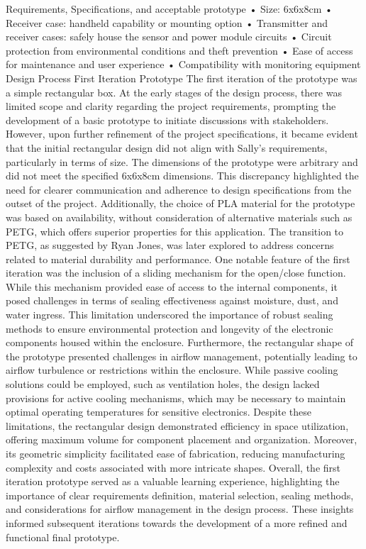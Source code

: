 \documentclass[class=report,11pt,crop=false]{standalone}
\begin{document}
Requirements, Specifications, and acceptable prototype
•	Size: 6x6x8cm
•	Receiver case: handheld capability or mounting option
•	Transmitter and receiver cases: safely house the sensor and power module circuits
•	Circuit protection from environmental conditions and theft prevention
•	Ease of access for maintenance and user experience
•	Compatibility with monitoring equipment
Design Process
First Iteration Prototype
The first iteration of the prototype was a simple rectangular box. At the early stages of the design process, there was limited scope and clarity regarding the project requirements, prompting the development of a basic prototype to initiate discussions with stakeholders.
However, upon further refinement of the project specifications, it became evident that the initial rectangular design did not align with Sally's requirements, particularly in terms of size. The dimensions of the prototype were arbitrary and did not meet the specified 6x6x8cm dimensions. This discrepancy highlighted the need for clearer communication and adherence to design specifications from the outset of the project.
Additionally, the choice of PLA material for the prototype was based on availability, without consideration of alternative materials such as PETG, which offers superior properties for this application. The transition to PETG, as suggested by Ryan Jones, was later explored to address concerns related to material durability and performance.
One notable feature of the first iteration was the inclusion of a sliding mechanism for the open/close function. While this mechanism provided ease of access to the internal components, it posed challenges in terms of sealing effectiveness against moisture, dust, and water ingress. This limitation underscored the importance of robust sealing methods to ensure environmental protection and longevity of the electronic components housed within the enclosure.
Furthermore, the rectangular shape of the prototype presented challenges in airflow management, potentially leading to airflow turbulence or restrictions within the enclosure. While passive cooling solutions could be employed, such as ventilation holes, the design lacked provisions for active cooling mechanisms, which may be necessary to maintain optimal operating temperatures for sensitive electronics.
Despite these limitations, the rectangular design demonstrated efficiency in space utilization, offering maximum volume for component placement and organization. Moreover, its geometric simplicity facilitated ease of fabrication, reducing manufacturing complexity and costs associated with more intricate shapes.
Overall, the first iteration prototype served as a valuable learning experience, highlighting the importance of clear requirements definition, material selection, sealing methods, and considerations for airflow management in the design process. These insights informed subsequent iterations towards the development of a more refined and functional final prototype.
\end{document}
